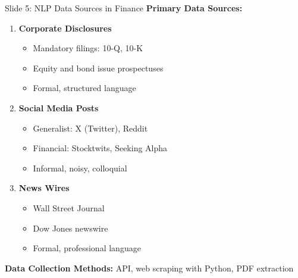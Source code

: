 \documentclass[8pt]{beamer}
\begin{document}
	\begin{frame}{Slide 5: NLP Data Sources in Finance}
		\fontsize{6.5}{7.5}\selectfont
		\textbf{Primary Data Sources:}
		\begin{enumerate}
			\item \textbf{Corporate Disclosures}
			\begin{itemize}
				\item Mandatory filings: 10-Q, 10-K
				\item Equity and bond issue prospectuses
				\item Formal, structured language
			\end{itemize}
			\item \textbf{Social Media Posts}
			\begin{itemize}
				\item Generalist: X (Twitter), Reddit
				\item Financial: Stocktwits, Seeking Alpha
				\item Informal, noisy, colloquial
			\end{itemize}
			\item \textbf{News Wires}
			\begin{itemize}
				\item Wall Street Journal
				\item Dow Jones newswire
				\item Formal, professional language
			\end{itemize}
		\end{enumerate}
		
		\textcolor{myblue}{\textbf{Data Collection Methods:}} API, web scraping with Python, PDF extraction
	\end{frame}
	
\end{document}
